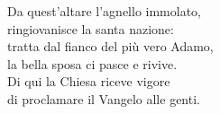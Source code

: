\spazio


\spazio

\strofa Da quest'altare l'agnello immolato,\\
ringiovanisce la santa nazione:\\
tratta dal fianco del più vero Adamo,\\
la bella sposa ci pasce e rivive.\\
Di qui la Chiesa riceve vigore\\
di proclamare il Vangelo alle genti.

\spazio

